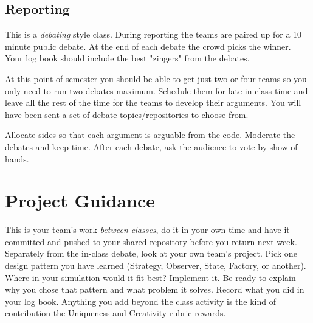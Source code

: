 \documentclass[twoside=false,DIV=14]{scrartcl}
\begin{document}
\subsection*{Reporting}

This is a \emph{debating} style class.  During reporting the teams are paired up for a 10 minute public debate.  At the end of each debate the crowd picks the winner.  Your log book should include the best "zingers" from the debates.

\begin{teacher}
At this point of semester you should be able to get just two or four teams so you only need to run two debates maximum.  Schedule them for late in class time and leave all the rest of the time for the teams to develop their arguments.  You will have been sent a set of debate topics/repositories to choose from.

Allocate sides so that each argument is arguable from the code.  Moderate the debates and keep time.  After each debate, ask the audience to vote by show of hands.
\end{teacher}

\section*{Project Guidance}

This is your team's work \emph{between classes}, do it in your own time and have it committed and pushed to your shared repository before you return next week.  Separately from the in-class debate, look at your own team's project.  Pick one design pattern you have learned (Strategy, Observer, State, Factory, or another).  Where in your simulation would it fit best?  Implement it.  Be ready to explain why you chose that pattern and what problem it solves.  Record what you did in your log book.  Anything you add beyond the class activity is the kind of contribution the Uniqueness and Creativity rubric rewards.
\end{document}
